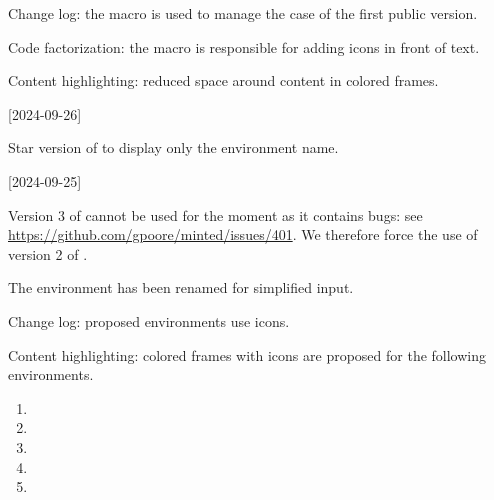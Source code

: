 \begin{tdocnew}
    \item Change log: the  macro is used to manage the case of the first public version.

    \item Code factorization: the  macro is responsible for adding icons in front of text.
\end{tdocnew}


\begin{tdocupdate}
    \item Content highlighting: reduced space around content in colored frames.
\end{tdocupdate}

\tdocsep




[2024-09-26]

\begin{tdocnew}
    \item Star version of  to display only the environment name.
\end{tdocnew}

\tdocsep




[2024-09-25]

\begin{tdocprob}
	\item Version 3 of  cannot be used for the moment as it contains bugs: see \url{https://github.com/gpoore/minted/issues/401}. We therefore force the use of version 2 of .
\end{tdocprob}


\begin{tdocbreak}
	\item The  environment has been renamed  for simplified input.
\end{tdocbreak}


\begin{tdocnew}
    \item Change log: proposed environments use icons.


    \item Content highlighting: colored frames with icons are proposed for the following environments.
    \bgroup
    \setlength\multicolsep{5pt}
    \begin{multicols}{3}
        \begin{enumerate}[topsep=0pt]
        	\item {}
        	\item {}
        	\item {}
        	\item {}
        	\item {}
        \end{enumerate}
    \end{multicols}
    \egroup
\end{tdocnew}

